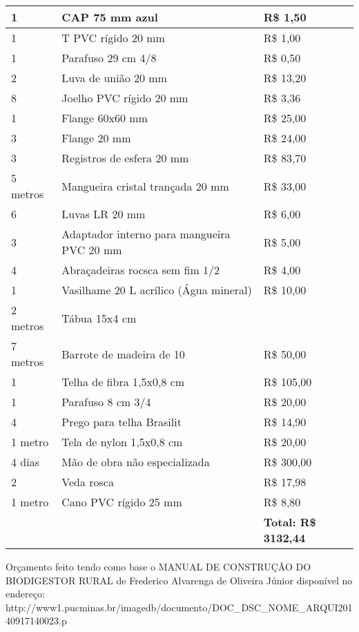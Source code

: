 \begin{table}[]
\begin{tabular}{|l|l|l|}
1 & CAP 75 mm azul & R\$ 1,50 \\ \hline
1 & T PVC rígido 20 mm & R\$ 1,00 \\ \hline
1 & Parafuso 29 cm 4/8 & R\$ 0,50 \\ \hline
2 & Luva de união 20 mm & R\$ 13,20 \\ \hline
8 & Joelho PVC rígido 20 mm & R\$ 3,36 \\ \hline
1 & Flange 60x60 mm & R\$ 25,00 \\ \hline
3 & Flange 20 mm & R\$ 24,00 \\ \hline
3 & Registros de esfera 20 mm & R\$ 83,70 \\ \hline
5 metros & Mangueira cristal trançada 20 mm & R\$ 33,00 \\ \hline
6 & Luvas LR 20 mm & R\$ 6,00 \\ \hline
3 & Adaptador interno para mangueira PVC 20 mm & R\$ 5,00 \\ \hline
4 & Abraçadeiras rocsca sem fim 1/2 & R\$ 4,00 \\ \hline
1 & Vasilhame 20 L acrílico (Água mineral) & R\$ 10,00 \\ \hline
2 metros & Tábua 15x4 cm &  \\ \hline
7 metros & Barrote de madeira de 10 & R\$ 50,00 \\ \hline
1 & Telha de fibra 1,5x0,8 cm & R\$ 105,00 \\ \hline
1 & Parafuso 8 cm 3/4 & R\$ 20,00 \\ \hline
4 & Prego para telha Brasilit & R\$ 14,90 \\ \hline
1 metro & Tela de nylon 1,5x0,8 cm & R\$ 20,00 \\ \hline
4 dias & Mão de obra não especializada & R\$ 300,00 \\ \hline
2 & Veda rosca & R\$ 17,98 \\ \hline
1 metro & Cano PVC rígido 25 mm & R\$ 8,80 \\ \hline
 &  & \textbf{Total: R\$ 3132,44} \\ \hline
\end{tabular}
\end{table}

Orçamento feito tendo como base o MANUAL DE CONSTRUÇÃO DO BIODIGESTOR RURAL de Frederico Alvarenga de Oliveira Júnior disponível no endereço: http://www1.pucminas.br/imagedb/documento/DOC_DSC_NOME_ARQUI20140917140023.p
